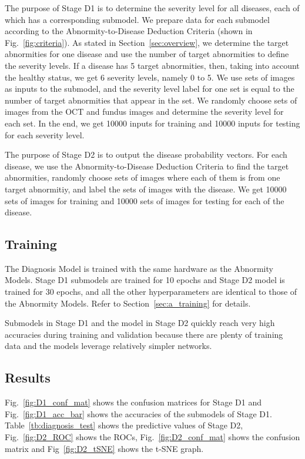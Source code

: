 \documentclass{article}
\begin{document}
	The purpose of Stage D1 is to determine the severity level for all diseases, each of which has a corresponding submodel. We prepare data for each submodel according to the Abnormity-to-Disease Deduction Criteria (shown in Fig.~\ref{fig:criteria}). As stated in Section~\ref{sec:overview}, we determine the target abnormities for one disease and use the number of target abnormities to define the severity levels. If a disease has 5 target abnormities, then, taking into account the healthy status, we get 6 severity levels, namely 0 to 5. We use sets of images as inputs to the submodel, and the severity level label for one set is equal to the number of target abnormities that appear in the set. We randomly choose sets of images from the OCT and fundus images and determine the severity level for each set. In the end, we get 10000 inputs for training and 10000 inputs for testing for each severity level. 
	
	The purpose of Stage D2 is to output the disease probability vectors. For each disease, we use the Abnormity-to-Disease Deduction Criteria to find the target abnormities, randomly choose sets of images where each of them is from one target abnormitiy, and label the sets of images with the disease. We get 10000 sets of images for training and 10000 sets of images for testing for each of the disease.
	
	\subsection{Training}
	
	The Diagnosis Model is trained with the same hardware as the Abnormity Models. Stage D1 submodels are trained for 10 epochs and Stage D2 model is trained for 30 epochs, and all the other hyperparameters are identical to those of the Abnormity Models. Refer to Section~\ref{sec:a_training} for details. 
	
	Submodels in Stage D1 and the model in Stage D2 quickly reach very high accuracies during training and validation because there are plenty of training data and the models leverage relatively simpler networks. 
	
	
	\subsection{Results}
	
	Fig.~\ref{fig:D1_conf_mat} shows the confusion matrices for Stage D1 and Fig.~\ref{fig:D1_acc_bar} shows the accuracies of the submodels of Stage D1. Table~\ref{tb:diagnosis_test} shows the predictive values of Stage D2, Fig.~\ref{fig:D2_ROC} shows the ROCs, Fig.~\ref{fig:D2_conf_mat} shows the confusion matrix and Fig~\ref{fig:D2_tSNE} shows the t-SNE graph.
	
\end{document}
